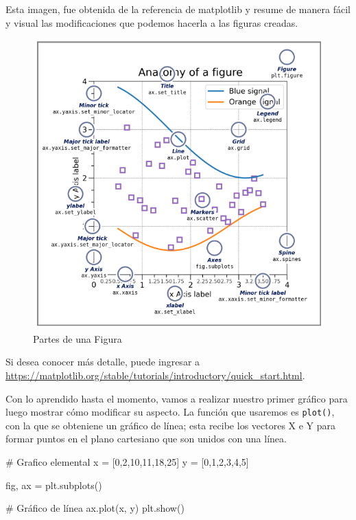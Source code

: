 \documentclass[
  letterpaper,
  DIV=11,
  numbers=noendperiod]{scrreprt}
\newenvironment{Shaded}{\begin{snugshade}}{\end{snugshade}}
\newcommand{\CommentTok}[1]{\textcolor[rgb]{0.37,0.37,0.37}{#1}}
\newcommand{\DecValTok}[1]{\textcolor[rgb]{0.68,0.00,0.00}{#1}}
\newcommand{\NormalTok}[1]{\textcolor[rgb]{0.00,0.23,0.31}{#1}}
\newcommand{\OperatorTok}[1]{\textcolor[rgb]{0.37,0.37,0.37}{#1}}
\begin{document}
Esta imagen, fue obtenida de la referencia de matplotlib y resume de
manera fácil y visual las modificaciones que podemos hacerla a las
figuras creadas.

\begin{figure}[H]

{\centering \includegraphics{./imgs/unidad_6/matplotlib.png}

}

\caption{Partes de una Figura}

\end{figure}%

Si desea conocer más detalle, puede ingresar a
\url{https://matplotlib.org/stable/tutorials/introductory/quick_start.html}.

Con lo aprendido hasta el momento, vamos a realizar nuestro primer
gráfico para luego mostrar cómo modificar su aspecto. La función que
usaremos es \texttt{plot()}, con la que se obteniene un gráfico de
línea; esta recibe los vectores X e Y para formar puntos en el plano
cartesiano que son unidos con una línea.

\begin{Shaded}
\begin{Highlighting}[]
\CommentTok{\# Grafico elemental}
\NormalTok{x }\OperatorTok{=}\NormalTok{ [}\DecValTok{0}\NormalTok{,}\DecValTok{2}\NormalTok{,}\DecValTok{10}\NormalTok{,}\DecValTok{11}\NormalTok{,}\DecValTok{18}\NormalTok{,}\DecValTok{25}\NormalTok{]}
\NormalTok{y }\OperatorTok{=}\NormalTok{ [}\DecValTok{0}\NormalTok{,}\DecValTok{1}\NormalTok{,}\DecValTok{2}\NormalTok{,}\DecValTok{3}\NormalTok{,}\DecValTok{4}\NormalTok{,}\DecValTok{5}\NormalTok{]}

\NormalTok{fig, ax }\OperatorTok{=}\NormalTok{ plt.subplots()}

\CommentTok{\# Gráfico de línea}
\NormalTok{ax.plot(x, y)}
\NormalTok{plt.show()}
\end{Highlighting}
\end{Shaded}
\end{document}
